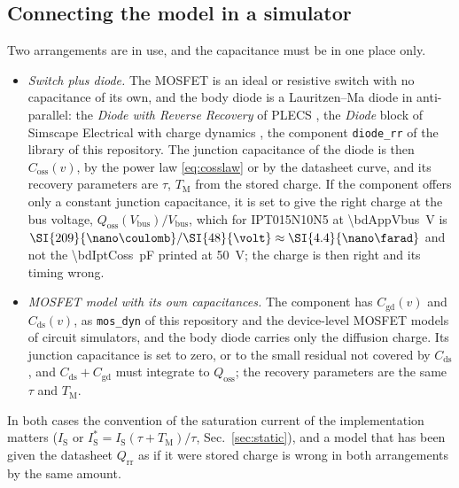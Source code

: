 \documentclass[10pt,a4paper]{scrartcl}
\newcommand{\Qrr}{Q_\mathrm{rr}}
\newcommand{\Qoss}{Q_\mathrm{oss}}
\newcommand{\Coss}{C_\mathrm{oss}}
\newcommand{\Cds}{C_\mathrm{ds}}
\newcommand{\Cgd}{C_\mathrm{gd}}
\newcommand{\TM}{T_\mathrm{M}}
\newcommand{\IS}{I_\mathrm{S}}
\newcommand{\IPT}{IPT015N10N5}
\begin{document}
\subsection{Connecting the model in a simulator}
\label{sec:connect}
Two arrangements are in use, and the capacitance must be in one place only.
\begin{itemize}
\item \emph{Switch plus diode.} The MOSFET is an ideal or resistive switch with no capacitance of its own, and the body diode is a Lauritzen--Ma diode in anti-parallel: the \emph{Diode with Reverse Recovery} of PLECS \cite{plecs}, the \emph{Diode} block of Simscape Electrical with charge dynamics \cite{mathworks}, the component \texttt{diode\_rr} of the library of this repository. The junction capacitance of the diode is then $\Coss(v)$, by the power law \eqref{eq:cosslaw} or by the datasheet curve, and its recovery parameters are $\tau$, $\TM$ from the stored charge. If the component offers only a constant junction capacitance, it is set to give the right charge at the bus voltage, $\Qoss(V_\mathrm{bus})/V_\mathrm{bus}$, which for \IPT{} at \SI{\bdAppVbus}{\volt} is $\SI{\bdAppQoss}{\nano\coulomb}/\SI{\bdAppVbus}{\volt} \approx \SI{4.4}{\nano\farad}$ and not the \SI{\bdIptCoss}{\pico\farad} printed at \SI{50}{\volt}; the charge is then right and its timing wrong.
\item \emph{MOSFET model with its own capacitances.} The component has $\Cgd(v)$ and $\Cds(v)$, as \texttt{mos\_dyn} of this repository \cite{mosdyn} and the device-level MOSFET models of circuit simulators, and the body diode carries only the diffusion charge. Its junction capacitance is set to zero, or to the small residual not covered by $\Cds$, and $\Cds + \Cgd$ must integrate to $\Qoss$; the recovery parameters are the same $\tau$ and $\TM$.
\end{itemize}
In both cases the convention of the saturation current of the implementation matters ($\IS$ or $\IS^{*} = \IS(\tau+\TM)/\tau$, Sec.~\ref{sec:static}), and a model that has been given the datasheet $\Qrr$ as if it were stored charge is wrong in both arrangements by the same amount.

\end{document}
